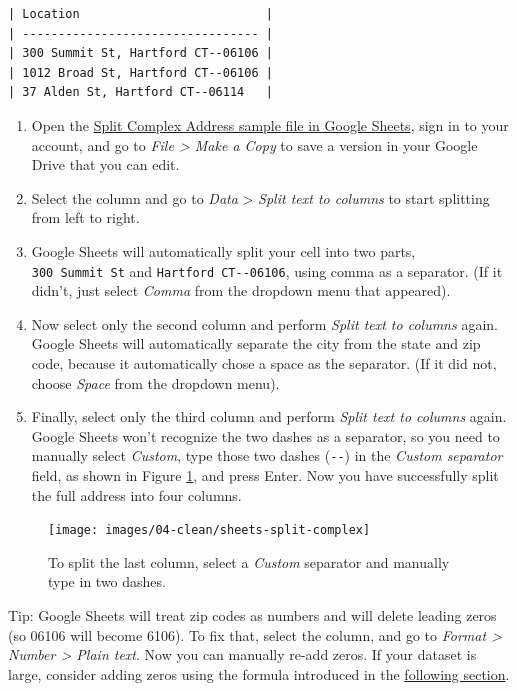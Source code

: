 \documentclass[
  english,
]{book}
\begin{document}
\begin{verbatim}
| Location                          |
| --------------------------------- |
| 300 Summit St, Hartford CT--06106 |
| 1012 Broad St, Hartford CT--06106 |
| 37 Alden St, Hartford CT--06114   |
\end{verbatim}

\begin{enumerate}
\def\labelenumi{\arabic{enumi}.}
\item
  Open the \href{https://docs.google.com/spreadsheets/d/1XkWrHBCK5HedAWskkb5lligWoozBVXc6w7_FRuYebPI/edit\#gid=0}{Split Complex Address sample file in Google Sheets}, sign in to your account, and go to \emph{File \textgreater{} Make a Copy} to save a version in your Google Drive that you can edit.
\item
  Select the column and go to \emph{Data} \textgreater{} \emph{Split text to columns} to start splitting from left to right.
\item
  Google Sheets will automatically split your cell into two parts, \texttt{300\ Summit\ St} and \texttt{Hartford\ CT-\/-06106}, using comma as a separator. (If it didn't, just select \emph{Comma} from the dropdown menu that appeared).
\item
  Now select only the second column and perform \emph{Split text to columns} again. Google Sheets will automatically separate the city from the state and zip code, because it automatically chose a space as the separator. (If it did not, choose \emph{Space} from the dropdown menu).
\item
  Finally, select only the third column and perform \emph{Split text to columns} again. Google Sheets won't recognize the two dashes as a separator, so you need to manually select \emph{Custom}, type those two dashes (\texttt{-\/-}) in the \emph{Custom separator} field, as shown in Figure \ref{fig:sheets-split-complex}, and press Enter. Now you have successfully split the full address into four columns.
\end{enumerate}



\begin{figure}
\texttt{[image: images/04-clean/sheets-split-complex]} \caption{To split the last column, select a \emph{Custom} separator and manually type in two dashes.}\label{fig:sheets-split-complex}
\end{figure}

Tip: Google Sheets will treat zip codes as numbers and will delete leading zeros (so 06106 will become 6106). To fix that, select the column, and go to \emph{Format \textgreater{} Number \textgreater{} Plain text}. Now you can manually re-add zeros. If your dataset is large, consider adding zeros using the formula introduced in the \href{combine-data.html}{following section}.
\end{document}
